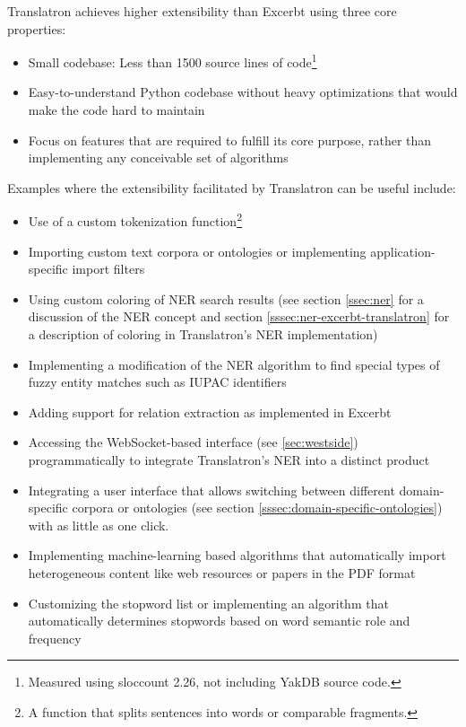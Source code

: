 \documentclass[a4paper, 12pt, twoside, reqn]{report}
\numberwithin{figure}{chapter}
\newtheorem[L]{boxedDefinition}{Definition}
\newtheorem[L]{boxedExample}{Example}
\begin{document}
Translatron achieves higher extensibility than Excerbt using three core properties:
\begin{itemize}
 \item Small codebase: Less than 1500 source lines of code\footnote{Measured using sloccount 2.26, not including YakDB source code.}
 \item Easy-to-understand Python codebase without heavy optimizations that would make the code hard to maintain
 \item Focus on features that are required to fulfill its core purpose, rather than implementing any conceivable set of algorithms
\end{itemize}

Examples where the extensibility facilitated by Translatron can be useful include:
\begin{itemize}
 \item Use of a custom tokenization function\footnote{A function that splits sentences into words or comparable fragments.}
 \item Importing custom text corpora or ontologies or implementing application-specific import filters
 \item Using custom coloring of NER search results (see section \ref{ssec:ner} for a discussion of the NER concept and section \ref{sssec:ner-excerbt-translatron} for a description of coloring in Translatron's NER implementation)
 \item Implementing a modification of the NER algorithm to find special types of fuzzy entity matches such as IUPAC identifiers
 \item Adding support for relation extraction as implemented in Excerbt
 \item Accessing the WebSocket-based interface (see \ref{sec:westside}) programmatically to integrate Translatron's NER into a distinct product
 \item Integrating a user interface that allows switching between different domain-specific corpora or ontologies (see section \ref{sssec:domain-specific-ontologies}) with as little as one click.
 \item Implementing machine-learning based algorithms that automatically import heterogeneous content like web resources or papers in the PDF format
 \item Customizing the stopword list or implementing an algorithm that automatically determines stopwords based on word semantic role and frequency
\end{itemize}
\end{document}

